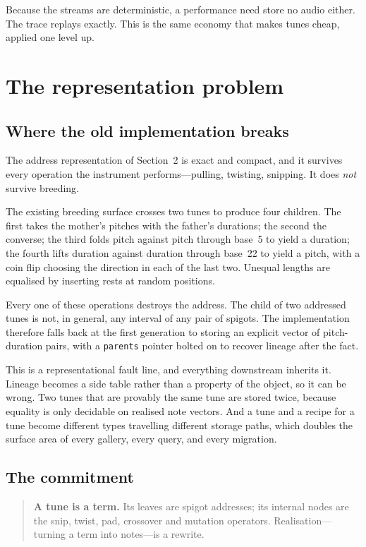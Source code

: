 \documentclass[11pt,a4paper]{article}
\theoremstyle{definition}
\theoremstyle{plain}
\begin{document}
Because the streams are deterministic, a performance need store no audio either. The trace replays
exactly. This is the same economy that makes tunes cheap, applied one level up.

\section{The representation problem}
\label{sec:repr}

\subsection{Where the old implementation breaks}

The address representation of Section~2 is exact and compact, and it survives every operation the
instrument performs---pulling, twisting, snipping. It does \emph{not} survive breeding.

The existing breeding surface crosses two tunes to produce four children. The first takes the
mother's pitches with the father's durations; the second the converse; the third folds pitch
against pitch through base~5 to yield a duration; the fourth lifts duration against duration
through base~22 to yield a pitch, with a coin flip choosing the direction in each of the last two.
Unequal lengths are equalised by inserting rests at random positions.

Every one of these operations destroys the address. The child of two addressed tunes is not, in
general, any interval of any pair of spigots. The implementation therefore falls back at the first
generation to storing an explicit vector of pitch-duration pairs, with a \texttt{parents} pointer
bolted on to recover lineage after the fact.

This is a representational fault line, and everything downstream inherits it. Lineage becomes a
side table rather than a property of the object, so it can be wrong. Two tunes that are provably
the same tune are stored twice, because equality is only decidable on realised note vectors. And a
tune and a recipe for a tune become different types travelling different storage paths, which
doubles the surface area of every gallery, every query, and every migration.

\subsection{The commitment}

\begin{quote}
\textbf{A tune is a term.} Its leaves are spigot addresses; its internal nodes are the snip, twist,
pad, crossover and mutation operators. Realisation---turning a term into notes---is a rewrite.
\end{quote}
\end{document}
